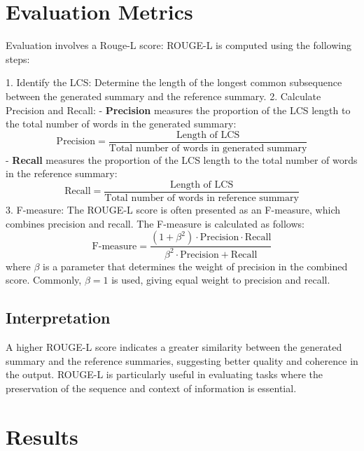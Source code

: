 \documentclass[11pt]{article}
\begin{document}
    \section{Evaluation Metrics}
    Evaluation involves a Rouge-L score:
    ROUGE-L is computed using the following steps:

    1. Identify the LCS: Determine the length of the longest common subsequence between the generated summary and the reference summary.
    2. Calculate Precision and Recall:
    - \textbf{Precision} measures the proportion of the LCS length to the total number of words in the generated summary:
        {\small
    \begin{equation}
        \text{Precision} = \frac{\text{Length of LCS}}{\text{Total number of words in generated summary}}
    \end{equation}
    }
    - \textbf{Recall} measures the proportion of the LCS length to the total number of words in the reference summary:
        {\small
    \begin{equation}
        \text{Recall} = \frac{\text{Length of LCS}}{\text{Total number of words in reference summary}}
    \end{equation}
    }
    3. F-measure: The ROUGE-L score is often presented as an F-measure, which combines precision and recall. The F-measure is calculated as follows:
    \begin{equation}
        \text{F-measure} = \frac{(1 + \beta^2) \cdot \text{Precision} \cdot \text{Recall}}{\beta^2 \cdot \text{Precision} + \text{Recall}}
    \end{equation}
    where $\beta$ is a parameter that determines the weight of precision in the combined score. Commonly, $\beta = 1$ is used, giving equal weight to precision and recall.

    \subsection{Interpretation}

    A higher ROUGE-L score indicates a greater similarity between the generated summary and the reference summaries, suggesting better quality and coherence in the output. ROUGE-L is particularly useful in evaluating tasks where the preservation of the sequence and context of information is essential.


    \section{Results}
\end{document}
